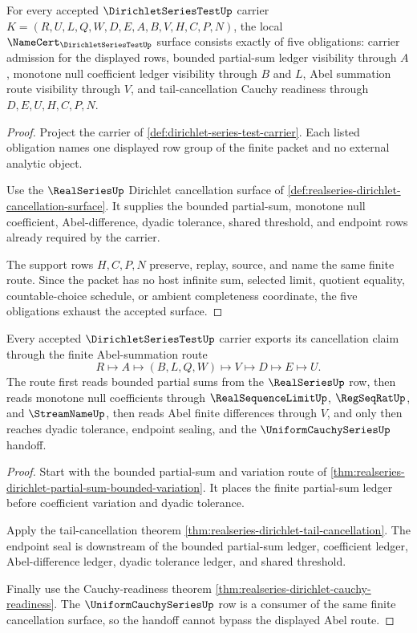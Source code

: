 \begin{theorem}
\label{thm:dirichlet-series-test-namecert-obligations}
For every accepted $\DirichletSeriesTestUp$ carrier $K=(R,U,L,Q,W,D,E,A,B,V,H,C,P,N)$, the local $\NameCert_{\DirichletSeriesTestUp}$ surface consists exactly of five obligations: carrier admission for the displayed rows, bounded partial-sum ledger visibility through $A$, monotone null coefficient ledger visibility through $B$ and $L$, Abel summation route visibility through $V$, and tail-cancellation Cauchy readiness through $D,E,U,H,C,P,N$.
\end{theorem}
\begin{proof}
Project the carrier of \autoref{def:dirichlet-series-test-carrier}. Each listed obligation names one displayed row group of the finite packet and no external analytic object.

Use the $\RealSeriesUp$ Dirichlet cancellation surface of \autoref{def:realseries-dirichlet-cancellation-surface}. It supplies the bounded partial-sum, monotone null coefficient, Abel-difference, dyadic tolerance, shared threshold, and endpoint rows already required by the carrier.

The support rows $H,C,P,N$ preserve, replay, source, and name the same finite route. Since the packet has no host infinite sum, selected limit, quotient equality, countable-choice schedule, or ambient completeness coordinate, the five obligations exhaust the accepted surface.
\end{proof}

\begin{theorem}
\label{thm:dirichlet-series-test-abel-summation-route}
Every accepted $\DirichletSeriesTestUp$ carrier exports its cancellation claim through the finite Abel-summation route
$$
R \longmapsto A \longmapsto (B,L,Q,W) \longmapsto V \longmapsto D \longmapsto E \longmapsto U .
$$
The route first reads bounded partial sums from the $\RealSeriesUp$ row, then reads monotone null coefficients through $\RealSequenceLimitUp$, $\RegSeqRatUp$, and $\StreamNameUp$, then reads Abel finite differences through $V$, and only then reaches dyadic tolerance, endpoint sealing, and the $\UniformCauchySeriesUp$ handoff.
\end{theorem}
\begin{proof}
Start with the bounded partial-sum and variation route of \autoref{thm:realseries-dirichlet-partial-sum-bounded-variation}. It places the finite partial-sum ledger before coefficient variation and dyadic tolerance.

Apply the tail-cancellation theorem \autoref{thm:realseries-dirichlet-tail-cancellation}. The endpoint seal is downstream of the bounded partial-sum ledger, coefficient ledger, Abel-difference ledger, dyadic tolerance ledger, and shared threshold.

Finally use the Cauchy-readiness theorem \autoref{thm:realseries-dirichlet-cauchy-readiness}. The $\UniformCauchySeriesUp$ row is a consumer of the same finite cancellation surface, so the handoff cannot bypass the displayed Abel route.
\end{proof}

